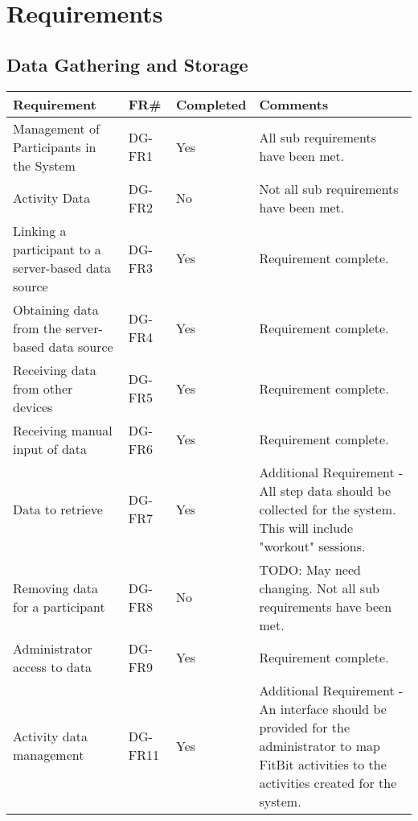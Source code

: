 \label{Requirements_chpt}
\chapter{Requirements}

\section{Data Gathering and Storage}
\begin{tabular}{ |p{5cm}|l|l|p{8cm}|}
\hline
\textbf{Requirement}	&	\textbf{FR\#}	&	\textbf{Completed}	&	\textbf{Comments} \\
\hline
Management of Participants in the System			& DG-FR1	& Yes	& All sub requirements have been met. \\
\hline
Activity Data										& DG-FR2	& No	& Not all sub requirements have been met. \\
\hline
Linking a participant to a server-based data source	& DG-FR3	& Yes	& Requirement complete. \\
\hline
Obtaining data from the server-based data source	& DG-FR4	& Yes	& Requirement complete. \\
\hline
Receiving data from other devices					& DG-FR5	& Yes	& Requirement complete. \\
\hline
Receiving manual input of data						& DG-FR6	& Yes	& Requirement complete. \\
\hline
Data to retrieve 									& DG-FR7	& Yes	& Additional Requirement - All step data should be collected for the system. This will include "workout" sessions. \\
\hline
Removing data for a participant						& DG-FR8	& No	& TODO: May need changing. Not all sub requirements have been met. \\
\hline
Administrator access to data						& DG-FR9	& Yes	& Requirement complete. \\
\hline
Activity data management							& DG-FR11	& Yes	& Additional Requirement - An interface should be provided for the administrator to map FitBit activities to the activities created for the system. \\
\hline
\end{tabular}


